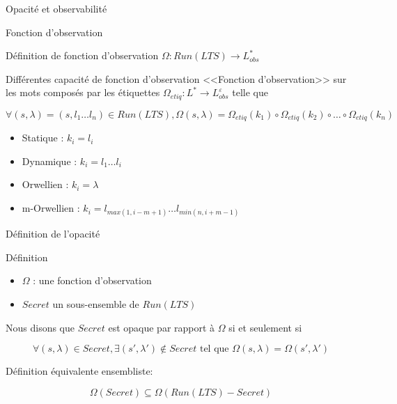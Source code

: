 \documentclass[11pt]{beamer}
\begin{document}
\begin{section}{Opacit\'e et observabilit\'e}
  \begin{frame}{Fonction d'observation}
    \begin{block}{D\'efinition de fonction d'observation}
      $\Omega : Run(LTS) \rightarrow L_{obs}^*$
    \end{block}
    
    \begin{block}{Diff\'erentes capacit\'e de fonction d'observation}
     <<Fonction d'observation>> sur les mots compos\'es par les \'etiquettes $\Omega_{etiq} : L^* \rightarrow L_{obs}^{\varepsilon}$ telle que 
	
	$\forall (s,\lambda)= (s,l_1\dots l_n) \in Run(LTS), \Omega(s,\lambda) = \Omega_{etiq}(k_1)\circ\Omega_{etiq}(k_2)\circ\dots\circ\Omega_{etiq}(k_n)$

      \begin{itemize}
        \item Statique : $k_i = l_i$
	\item Dynamique : $k_i = l_1 \dots l_i$
	\item Orwellien : $k_i = \lambda$
	\item m-Orwellien : $k_i = l_{max(1,i-m+1)} \dots l_{min(n,i+m-1)}$

      \end{itemize}
    \end{block}   
   
  \end{frame}
  
  \begin{frame}{D\'efinition de l'opacit\'e}
    \begin{block}{D\'efinition}
      \begin{itemize}
       \item $\Omega$ : une fonction d'observation 
       \item $Secret$ un sous-ensemble de $Run(LTS)$
      \end{itemize}

     Nous disons que $Secret$ est opaque par rapport \`a $\Omega$ si et seulement si
	
	$$\forall (s,\lambda) \in Secret, \exists (s',\lambda')\not\in Secret \mbox{ tel que } \Omega(s,\lambda) = \Omega (s',\lambda')$$
	
	D\'efinition \'equivalente ensembliste:
	
	$$\Omega(Secret)\subseteq \Omega(Run(LTS)-Secret)$$
    \end{block}
  \end{frame}
  

\end{section}
\end{document}
